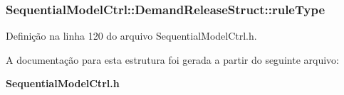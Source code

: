 \subsubsection[{rule\+Type}]{ Sequential\+Model\+Ctrl\+::\+Demand\+Release\+Struct\+::rule\+Type}\label{struct_sequential_model_ctrl_1_1_demand_release_struct_a90e969d9d68ab962223d11656b893461}


Definição na linha 120 do arquivo Sequential\+Model\+Ctrl.\+h.



A documentação para esta estrutura foi gerada a partir do seguinte arquivo\+:\begin{DoxyCompactItemize}
\item 
{\bf Sequential\+Model\+Ctrl.\+h}\end{DoxyCompactItemize}
